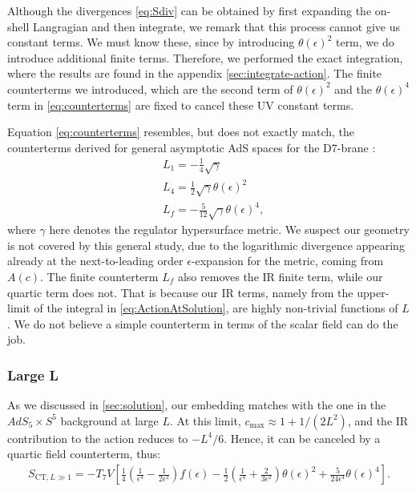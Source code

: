 Although the divergences \eqref{eq:Sdiv} can be obtained by first expanding the on-shell Langragian and then integrate, we remark that this process cannot give us constant terms. We must know these, since by introducing $\theta(\epsilon)^2$ term, we do introduce additional finite terms. Therefore, we performed the exact integration, where the results are found in the appendix \ref{sec:integrate-action}. The finite counterterms we introduced, which are the second term of $\theta(\epsilon)^2$ and the $\theta(\epsilon)^4$ term in \eqref{eq:counterterms} are fixed to cancel these UV constant terms.


Equation \eqref{eq:counterterms} resembles, but does not exactly match, the counterterms derived for general asymptotic AdS spaces for the D7-brane \cite{Karch:2005ms}:
\begin{align*}
& L_{1}=-\frac{1}{4} \sqrt{\gamma} \\
& L_{4}=\frac{1}{2} \sqrt{\gamma} \theta(\epsilon)^2 \\
& L_{f}= -\frac{5}{12}\sqrt{\gamma} \theta(\epsilon)^4,
\end{align*}
where $\gamma$ here denotes the regulator hypersurface metric. We suspect our geometry is not covered by this general study, due to the logarithmic divergence appearing already at the next-to-leading order $\epsilon$-expansion for the metric, coming from $A(c)$. The finite counterterm $L_f$ also removes the IR finite term, while our quartic term does not. That is because our IR terms, namely from the upper-limit of the integral in \eqref{eq:ActionAtSolution}, are highly non-trivial functions of $L$. We do not believe a simple counterterm in terms of the scalar field can do the job. 

\subsubsection*{Large L}
As we discussed in \ref{sec:solution}, our embedding matches with the one in the $AdS_5 \times S^5$ background at large $L$. At this limit, $c_{\max }\approx 1+ 1/(2 L^{2})$, and the IR contribution to the action reduces to $-L^4/6$. Hence, it can be canceled by a quartic field counterterm, thus:
\begin{align}\label{eq:countertermsLargeL}
 S_{\text{CT}, L\gg 1} =  -T_7 V \left[ 
  \frac{1}{4} \left(\frac{1}{\epsilon ^4}-\frac{1}{2 \epsilon ^2}\right) f(\epsilon)
   -\frac{1}{2}\left(\frac{1}{\epsilon ^4}+\frac{2}{3 \epsilon ^2}\right) \theta (\epsilon)^2 + \frac{5}{24 \epsilon^4} \theta (\epsilon)^4
   \right].
\end{align}

